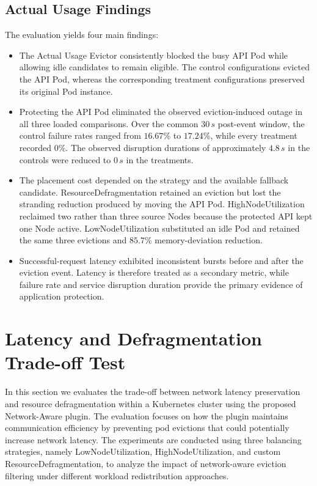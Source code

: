 \subsection{Actual Usage Findings}
\label{subsec:actualusage4_findings}
The evaluation yields four main findings:

\begin{itemize}
    \item The Actual Usage Evictor consistently blocked the busy API Pod while allowing idle candidates to remain eligible. The control configurations evicted the API Pod, whereas the corresponding treatment configurations preserved its original Pod instance.
    \item Protecting the API Pod eliminated the observed eviction-induced outage in all three loaded comparisons. Over the common \(30\,s\) post-event window, the control failure rates ranged from \(16.67\%\) to \(17.24\%\), while every treatment recorded \(0\%\). The observed disruption durations of approximately \(4.8\,s\) in the controls were reduced to \(0\,s\) in the treatments.
    \item The placement cost depended on the strategy and the available fallback candidate. ResourceDefragmentation retained an eviction but lost the stranding reduction produced by moving the API Pod. HighNodeUtilization reclaimed two rather than three source Nodes because the protected API kept one Node active. LowNodeUtilization substituted an idle Pod and retained the same three evictions and \(85.7\%\) memory-deviation reduction.
    \item Successful-request latency exhibited inconsistent bursts before and after the eviction event. Latency is therefore treated as a secondary metric, while failure rate and service disruption duration provide the primary evidence of application protection.
\end{itemize}

\section{Latency and Defragmentation Trade-off Test}
\label{sec:netaware4_test}
In this section we evaluates the trade-off between network latency preservation and resource defragmentation within a Kubernetes cluster using the proposed Network-Aware plugin. The evaluation focuses on how the plugin maintains communication efficiency by preventing pod evictions that could potentially increase network latency. The experiments are conducted using three balancing strategies, namely LowNodeUtilization, HighNodeUtilization, and custom ResourceDefragmentation, to analyze the impact of network-aware eviction filtering under different workload redistribution approaches.

